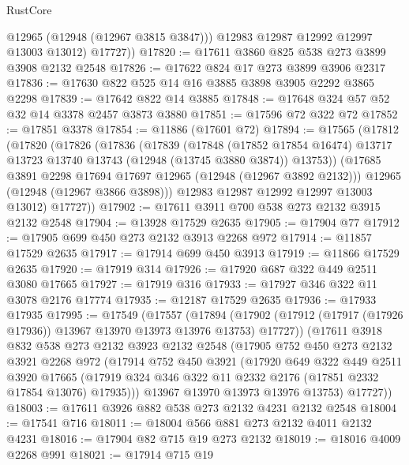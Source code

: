 \begin{lexlean}{RustCore}
\begin{coremodule}
            @12965
            (@12948 (@12967 @3815 @3847)))
          @12983
          @12987
          @12992
          @12997
          @13003
          @13012)
        @17727))
@17820 := @17611 @3860 @825 @538 @273 @3899 @3908 @2132 @2548
@17826 := @17622 @824 @17 @273 @3899 @3906 @2317
@17836 := @17630 @822 @525 @14 @16 @3885 @3898 @3905 @2292 @3865 @2298
@17839 := @17642 @822 @14 @3885
@17848 := @17648 @324 @57 @52 @32 @14 @3378 @2457 @3873 @3880
@17851 := @17596 @72 @322 @72
@17852 := @17851 @3378
@17854 := @11886 (@17601 @72)
@17894 := @17565
    (@17812
      (@17820
        (@17826
          (@17836
            (@17839
              (@17848
                (@17852 @17854 @16474)
                @13717
                @13723
                @13740
                @13743
                (@12948 (@13745 @3880 @3874))
                @13753))
            (@17685 @3891 @2298 @17694 @17697 @12965 (@12948 (@12967 @3892 @2132)))
            @12965
            (@12948 (@12967 @3866 @3898)))
          @12983
          @12987
          @12992
          @12997
          @13003
          @13012)
        @17727))
@17902 := @17611 @3911 @700 @538 @273 @2132 @3915 @2132 @2548
@17904 := @13928 @17529 @2635
@17905 := @17904 @77
@17912 := @17905 @699 @450 @273 @2132 @3913 @2268 @972
@17914 := @11857 @17529 @2635
@17917 := @17914 @699 @450 @3913
@17919 := @11866 @17529 @2635
@17920 := @17919 @314
@17926 := @17920 @687 @322 @449 @2511 @3080 @17665
@17927 := @17919 @316
@17933 := @17927 @346 @322 @11 @3078 @2176 @17774
@17935 := @12187 @17529 @2635
@17936 := @17933 @17935
@17995 := @17549
    (@17557
      (@17894 (@17902 (@17912 (@17917 (@17926 @17936)) @13967 @13970 @13973 @13976 @13753) @17727))
      (@17611
        @3918
        @832
        @538
        @273
        @2132
        @3923
        @2132
        @2548
        (@17905
          @752
          @450
          @273
          @2132
          @3921
          @2268
          @972
          (@17914
            @752
            @450
            @3921
            (@17920
              @649
              @322
              @449
              @2511
              @3920
              @17665
              (@17919 @324 @346 @322 @11 @2332 @2176 (@17851 @2332 @17854 @13076) @17935)))
          @13967
          @13970
          @13973
          @13976
          @13753)
        @17727))
@18003 := @17611 @3926 @882 @538 @273 @2132 @4231 @2132 @2548
@18004 := @17541 @716
@18011 := @18004 @566 @881 @273 @2132 @4011 @2132 @4231
@18016 := @17904 @82 @715 @19 @273 @2132
@18019 := @18016 @4009 @2268 @991
@18021 := @17914 @715 @19

\end{coremodule}
\end{lexlean}
